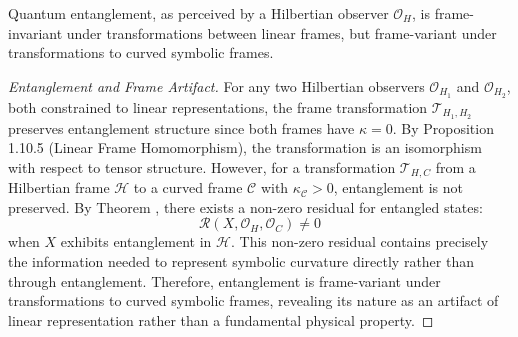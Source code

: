 \begin{corollary}
\label{corollary:bk8_entanglement_frame_invariance}
Quantum entanglement, as perceived by a Hilbertian observer $\mathcal{O}_H$, is frame-invariant under transformations between linear frames, but frame-variant under transformations to curved symbolic frames.
\end{corollary}
\begin{proof}[Entanglement and Frame Artifact]
\label{proof:bk8_entanglement_as_frame_artifact}
For any two Hilbertian observers $\mathcal{O}_{H_1}$ and $\mathcal{O}_{H_2}$, both constrained to linear representations, the frame transformation $\mathcal{T}_{H_1, H_2}$ preserves entanglement structure since both frames have $\kappa = 0$. By Proposition 1.10.5 (Linear Frame Homomorphism), the transformation is an isomorphism with respect to tensor structure.
However, for a transformation $\mathcal{T}_{H,C}$ from a Hilbertian frame $\mathcal{H}$ to a curved frame $\mathcal{C}$ with $\kappa_{\mathcal{C}} > 0$, entanglement is not preserved. By Theorem , there exists a non-zero residual for entangled states:
\begin{equation}
\mathcal{R}(X, \mathcal{O}_H, \mathcal{O}_C) \neq 0
\end{equation}
when $X$ exhibits entanglement in $\mathcal{H}$.
This non-zero residual contains precisely the information needed to represent symbolic curvature directly rather than through entanglement. Therefore, entanglement is frame-variant under transformations to curved symbolic frames, revealing its nature as an artifact of linear representation rather than a fundamental physical property.
\end{proof}
